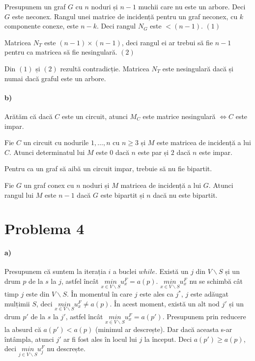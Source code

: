 \documentclass[paper=a4, fontsize=12pt]{scrartcl}
\begin{document}
Presupunem un graf $G$ cu $n$ noduri și $n-1$ muchii care nu este un arbore. Deci $G$ este neconex. Rangul unei matrice de incidență pentru un graf neconex, cu $k$ componente conexe, este $n-k$. Deci rangul $N_G$ este $< (n-1)$. $(1)$

Matricea $N_T$ este $(n-1) \times (n-1)$, deci rangul ei ar trebui să fie $n-1$ pentru ca matricea să fie nesingulară. $(2)$

Din $(1)$ și $(2)$ rezultă contradicție. Matricea $N_T$ este nesingulară dacă și numai dacă graful este un arbore.

\paragraph{b)}
Arătăm că dacă $C$ este un circuit, atunci $M_C$ este matrice nesingulară $\Leftrightarrow C$ este impar. 

Fie $C$ un circuit cu nodurile $1, …, n$ cu $n \geq 3$ și $M$ este matricea de incidență a lui $C$. Atunci determinatul lui $M$ este $0$ dacă $n$ este par și $2$ dacă $n$ este impar.

Pentru ca un graf să aibă un circuit impar, trebuie să nu fie bipartit.

Fie $G$ un graf conex cu $n$ noduri și $M$ matricea de incidență a lui $G$. Atunci rangul lui $M$ este $n-1$ dacă $G$ este bipartit și $n$ dacă nu este bipartit.

\section*{Problema 4}
\paragraph{a)}
Presupunem că suntem la iterația $i$ a buclei $while$. Există un $j$ din $V \backslash S$ și un drum $p$ de la $s$ la $j$, astfel încât $\underset{x \in V \backslash S}{min} u^F_x = a(p)$.
$\underset{x \in V \backslash S}{min} u^F_x$ nu se schimbă cât timp $j$ este din $V \backslash S$. În momentul în care $j$ este ales ca $j ^ *$, $j$ este adăugat mulțimii $S$, deci $\underset{x \in V \backslash S}{min} u^F_x \neq a(p)$. 
În acest moment, există un alt nod $j'$ și un drum $p'$ de la $s$ la $j'$, astfel încât $\underset{x \in V \backslash S}{min} u^F_x = a(p')$. 
Presupunem prin reducere la absurd că $a(p') < a(p)$ (minimul ar descrește). Dar dacă aceasta s-ar întâmpla, atunci $j'$ ar fi fost ales în locul lui $j$ la început.
Deci $a(p') \geq a(p)$, deci $\underset{j \in V \backslash S}{min} u^F_j$ nu descrește. 
\end{document}

